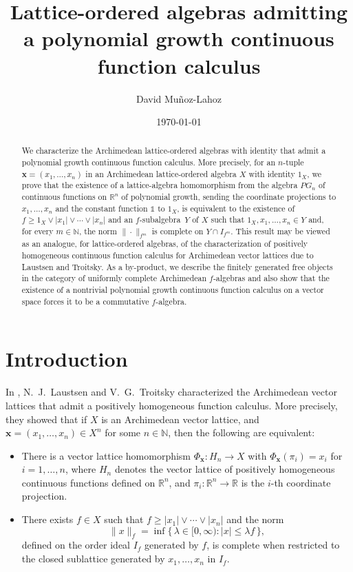 \documentclass{amsart}
\title[Polynomial growth continuous function calculus]{Lattice-ordered
algebras admitting a polynomial growth continuous function calculus}
\author{David Muñoz-Lahoz}
\date{\today}
\theoremstyle{plain}
\theoremstyle{definition}
\theoremstyle{remark}
\newcommand\N{\ensuremath{\mathbb{N}}}
\newcommand\R{\ensuremath{\mathbb{R}}}
\newcommand{\one}{\mathbb{1}}
\newcommand{\falg}{$f\!$-algebra}
\newcommand{\fsubalg}{$f\!$-subalgebra}
\begin{document}
\begin{abstract}
We characterize the Archimedean lattice-ordered algebras with identity
that admit a polynomial growth continuous function calculus. More
precisely, for an $n$-tuple $\bm x=(x_1,\dots,x_n)$ in an Archimedean
lattice-ordered algebra $X$ with identity $1_X$, we prove that the
existence of a lattice-algebra homomorphism from the algebra $PG_n$ of
continuous functions on $\mathbb{R}^n$ of polynomial growth, sending
the coordinate projections to $x_1,\dots,x_n$ and the constant
function $\one$ to $1_X$, is equivalent to the existence of $f\ge
1_X\vee |x_1|\vee \cdots \vee |x_n|$ and an \fsubalg\ $Y$ of $X$ such
that $1_X,x_1,\ldots ,x_n \in Y$ and, for every $m \in \N$, the norm
$\|{\cdot }\|_{f^{m}}$ is complete on $Y\cap I_{f^{m}}$. This result
may be viewed as an analogue, for lattice-ordered algebras, of the
characterization of positively homogeneous continuous function
calculus for Archimedean vector lattices due to Laustsen and Troitsky.
As a by-product, we describe the finitely generated free objects in
the category of uniformly complete Archimedean \falg s and also show that
the existence of a nontrivial polynomial growth continuous function
calculus on a vector space forces it to be a commutative \falg .
\end{abstract}

\maketitle

\section{Introduction}

In \cite{laustsen_troitsky2020}, N.\ J.\ Laustsen and V.\ G.\ Troitsky
characterized the Archimedean vector lattices that admit a positively
homogeneous function calculus. More precisely, they showed that if $X$
is an Archimedean vector lattice, and $\bm x=(x_1,\ldots ,x_n) \in
X^{n}$ for some $n \in \N$, then the following are equivalent:
\begin{itemize}
    \item There is a vector lattice homomorphism $\Phi _{\bm x}\colon
        H_n\to X$ with $\Phi _{\bm x}(\pi _i)=x_i$ for $i=1,\ldots
        ,n$, where $H_n$ denotes the vector lattice of positively
        homogeneous continuous functions defined on $\R^{n}$, and $\pi
        _i\colon \R^{n}\to \R$ is the $i$-th coordinate projection.
    \item There exists $f \in X$ such that $f\ge |x_1|\vee \cdots \vee
        |x_n|$ and the norm
        \[
        \|x\|_f=\inf \{\, \lambda \in [0,\infty ) : |x|\le \lambda f
        \, \},
        \]
        defined on the order ideal $I_f$ generated by $f$, is complete
        when restricted to the closed sublattice generated by
        $x_1,\ldots ,x_n$ in $I_f$.
\end{itemize}
\end{document}
